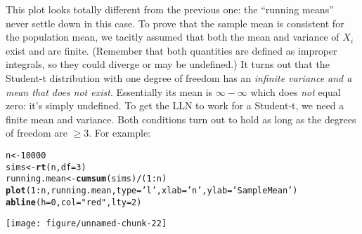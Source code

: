 \documentclass[addpoints,12pt]{exam}\usepackage[]{graphicx}\usepackage[]{color}
\makeatletter
\def\maxwidth{ %
  \ifdim\Gin@nat@width>\linewidth
    \linewidth
  \else
    \Gin@nat@width
  \fi
}
\newcommand{\hlnum}[1]{\textcolor[rgb]{0.686,0.059,0.569}{#1}}%
\newcommand{\hlstr}[1]{\textcolor[rgb]{0.192,0.494,0.8}{#1}}%
\newcommand{\hlopt}[1]{\textcolor[rgb]{0,0,0}{#1}}%
\newcommand{\hlstd}[1]{\textcolor[rgb]{0.345,0.345,0.345}{#1}}%
\newcommand{\hlkwb}[1]{\textcolor[rgb]{0.69,0.353,0.396}{#1}}%
\newcommand{\hlkwc}[1]{\textcolor[rgb]{0.333,0.667,0.333}{#1}}%
\newcommand{\hlkwd}[1]{\textcolor[rgb]{0.737,0.353,0.396}{\textbf{#1}}}%
\newenvironment{kframe}{%
 \def\at@end@of@kframe{}%
 \ifinner\ifhmode%
  \def\at@end@of@kframe{\end{minipage}}%
  \begin{minipage}{\columnwidth}%
 \fi\fi%
 \def\FrameCommand##1{\hskip\@totalleftmargin \hskip-\fboxsep
 \colorbox{shadecolor}{##1}\hskip-\fboxsep
     \hskip-\linewidth \hskip-\@totalleftmargin \hskip\columnwidth}%
 \MakeFramed {\advance\hsize-\width
   \@totalleftmargin\z@ \linewidth\hsize
   \@setminipage}}%
 {\par\unskip\endMakeFramed%
 \at@end@of@kframe}
\newenvironment{knitrout}{}{} %
\makeatother
\begin{document}
\begin{questions}
\begin{parts}
\begin{solution}
\begin{knitrout}
\end{knitrout}
This plot looks totally different from the previous one: the ``running means'' never settle down in this case. To prove that the sample mean is consistent for the population mean, we tacitly assumed that both the mean and variance of $X_i$ exist and are finite. (Remember that both quantities are defined as improper integrals, so they could diverge or may be undefined.) It turns out that the Student-t distribution with one degree of freedom has an \emph{infinite variance and a mean that does not exist}. Essentially its mean is $\infty - \infty$ which does \emph{not} equal zero: it's simply undefined. To get the LLN to work for a Student-t, we need a finite mean and variance. Both conditions turn out to hold as long as the degrees of freedom are $\geq 3$. For example:
\begin{knitrout}
\color{fgcolor}\begin{kframe}
\begin{alltt}
\hlstd{n} \hlkwb{<-} \hlnum{10000}
\hlstd{sims} \hlkwb{<-} \hlkwd{rt}\hlstd{(n,} \hlkwc{df} \hlstd{=} \hlnum{3}\hlstd{)}
\hlstd{running.mean} \hlkwb{<-} \hlkwd{cumsum}\hlstd{(sims)}\hlopt{/}\hlstd{(}\hlnum{1}\hlopt{:}\hlstd{n)}
\hlkwd{plot}\hlstd{(}\hlnum{1}\hlopt{:}\hlstd{n, running.mean,} \hlkwc{type} \hlstd{=} \hlstr{'l'}\hlstd{,} \hlkwc{xlab} \hlstd{=} \hlstr{'n'}\hlstd{,} \hlkwc{ylab} \hlstd{=} \hlstr{'Sample Mean'}\hlstd{)}
\hlkwd{abline}\hlstd{(}\hlkwc{h} \hlstd{=} \hlnum{0}\hlstd{,} \hlkwc{col} \hlstd{=} \hlstr{"red"}\hlstd{,} \hlkwc{lty} \hlstd{=} \hlnum{2}\hlstd{)}
\end{alltt}
\end{kframe}

{\centering \texttt{[image: figure/unnamed-chunk-22]} 

}



\end{knitrout}
  \end{solution}
    \end{parts}

\end{questions}
\end{document}
